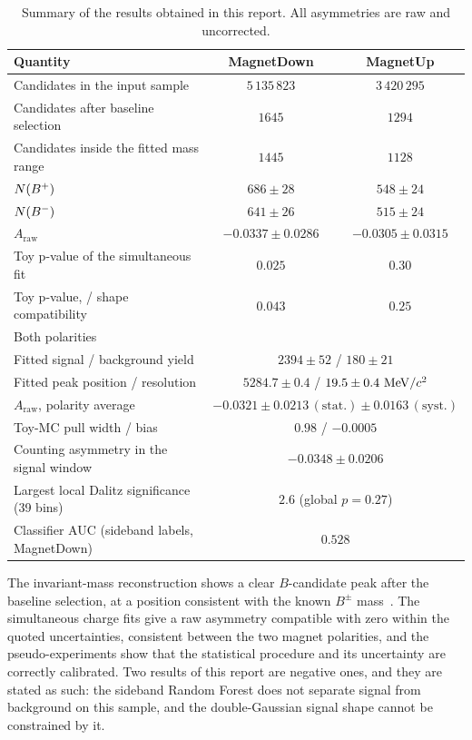 \begin{table}[H]
  \centering
  \caption{Summary of the results obtained in this report. All asymmetries are raw and uncorrected.}
  \label{tab:summary}
  \begin{tabular}{lcc}
    \toprule
    Quantity & MagnetDown & MagnetUp \\
    \midrule
    Candidates in the input sample & $5\,135\,823$ & $3\,420\,295$ \\
    Candidates after baseline selection & $1645$ & $1294$ \\
    Candidates inside the fitted mass range & $1445$ & $1128$ \\
    $N(B^+)$ & $686 \pm 28$ & $548 \pm 24$ \\
    $N(B^-)$ & $641 \pm 26$ & $515 \pm 24$ \\
    $A_{\mathrm{raw}}$ & $-0.0337 \pm 0.0286$ & $-0.0305 \pm 0.0315$ \\
    Toy p-value of the simultaneous fit & $0.025$ & $0.30$ \\
    Toy p-value, \Bplus{}/\Bminus{} shape compatibility & $0.043$ & $0.25$ \\
    \midrule
    \multicolumn{3}{l}{Both polarities} \\
    \midrule
    Fitted signal / background yield & \multicolumn{2}{c}{$2394 \pm 52$ / $180 \pm 21$} \\
    Fitted peak position / resolution & \multicolumn{2}{c}{$5284.7 \pm 0.4$ / $19.5 \pm 0.4~\mathrm{MeV}/c^2$} \\
    $A_{\mathrm{raw}}$, polarity average & \multicolumn{2}{c}{$-0.0321 \pm 0.0213\,\mathrm{(stat.)} \pm 0.0163\,\mathrm{(syst.)}$} \\
    Toy-MC pull width / bias & \multicolumn{2}{c}{$0.98$ / $-0.0005$} \\
    Counting asymmetry in the signal window & \multicolumn{2}{c}{$-0.0348 \pm 0.0206$} \\
    Largest local Dalitz significance (39 bins) & \multicolumn{2}{c}{$2.6$ (global $p = 0.27$)} \\
    Classifier AUC (sideband labels, MagnetDown) & \multicolumn{2}{c}{$0.528$} \\
    \bottomrule
  \end{tabular}
\end{table}

The invariant-mass reconstruction shows a clear $B$-candidate peak after the
baseline selection, at a position consistent with the known $B^\pm$
mass~\cite{pdg}. The simultaneous charge fits give a raw asymmetry compatible with
zero within the quoted uncertainties, consistent between the two magnet
polarities, and the pseudo-experiments show that the statistical procedure and its
uncertainty are correctly calibrated. Two results of this report are negative
ones, and they are stated as such: the sideband Random Forest does not separate
signal from background on this sample, and the double-Gaussian signal shape
cannot be constrained by it.


